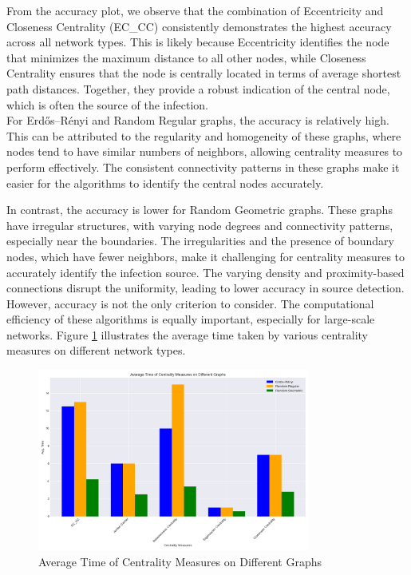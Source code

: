 From the accuracy plot, we observe that the combination of Eccentricity and Closeness Centrality (EC\_CC) consistently demonstrates the highest accuracy across all network types. This is likely because Eccentricity identifies the node that minimizes the maximum distance to all other nodes, while Closeness Centrality ensures that the node is centrally located in terms of average shortest path distances. Together, they provide a robust indication of the central node, which is often the source of the infection.\\

For Erdős–Rényi and Random Regular graphs, the accuracy is relatively high. This can be attributed to the regularity and homogeneity of these graphs, where nodes tend to have similar numbers of neighbors, allowing centrality measures to perform effectively. The consistent connectivity patterns in these graphs make it easier for the algorithms to identify the central nodes accurately.

In contrast, the accuracy is lower for Random Geometric graphs. These graphs have irregular structures, with varying node degrees and connectivity patterns, especially near the boundaries. The irregularities and the presence of boundary nodes, which have fewer neighbors, make it challenging for centrality measures to accurately identify the infection source. The varying density and proximity-based connections disrupt the uniformity, leading to lower accuracy in source detection.\\

However, accuracy is not the only criterion to consider. The computational efficiency of these algorithms is equally important, especially for large-scale networks. Figure \ref{fig:average_time_centrality_measures} illustrates the average time taken by various centrality measures on different network types.

\begin{figure}[H]
    \centering
    \includegraphics[width=0.8\textwidth]{Average_Time_Centrality_Measures.png}
    \caption{Average Time of Centrality Measures on Different Graphs}
    \label{fig:average_time_centrality_measures}
\end{figure}

